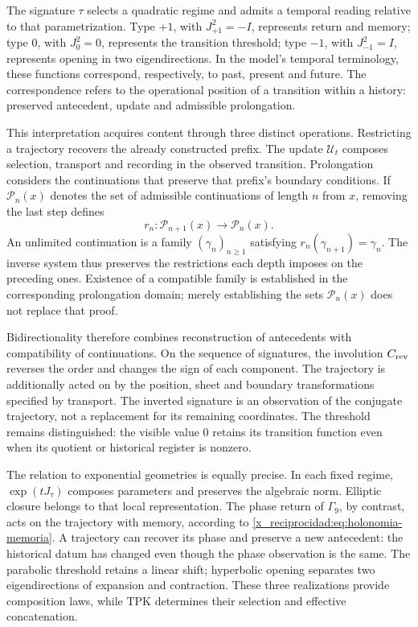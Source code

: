The signature \(\tau\) selects a quadratic regime and admits a temporal
reading relative to that parametrization. Type \(+1\), with
\(J_{+1}^{2}=-I\), represents return and memory; type \(0\), with
\(J_0^{2}=0\), represents the transition threshold; type \(-1\), with
\(J_{-1}^{2}=I\), represents opening in two eigendirections. In the
model's temporal terminology, these functions correspond,
respectively, to past, present and future. The correspondence refers
to the operational position of a transition within a history:
preserved antecedent, update and admissible prolongation.

This interpretation acquires content through three distinct operations.
Restricting a trajectory recovers the already constructed prefix. The
update \(\mathcal U_t\) composes selection, transport and recording in
the observed transition. Prolongation considers the continuations that
preserve that prefix's boundary conditions. If
\(\mathcal P_n(x)\) denotes the set of admissible continuations of
length \(n\) from \(x\), removing the last step defines
\[
 r_n:\mathcal P_{n+1}(x)\longrightarrow\mathcal P_n(x).
\]
An unlimited continuation is a family \((\gamma_n)_{n\geq1}\)
satisfying \(r_n(\gamma_{n+1})=\gamma_n\). The inverse system thus preserves
the restrictions each depth imposes on the
preceding ones. Existence of a compatible family is established in the
corresponding prolongation domain; merely establishing the
sets \(\mathcal P_n(x)\) does not replace that proof.

Bidirectionality therefore combines reconstruction of antecedents
with compatibility of continuations. On the sequence of signatures, the
involution \(C_{\rm rev}\) reverses the order and changes the sign of each
component. The trajectory is additionally acted on by the position,
sheet and boundary transformations specified by transport. The inverted
signature is an observation of the conjugate trajectory, not a replacement
for its remaining coordinates. The threshold remains distinguished: the visible
value \(0\) retains its transition function even when its quotient
or historical register is nonzero.

The relation to exponential geometries is equally precise. In
each fixed regime, \(\exp(tJ_\tau)\) composes parameters and preserves the
algebraic norm. Elliptic closure belongs to that local representation.
The phase return of \(\Gamma_9\), by contrast, acts on the trajectory
with memory, according to \eqref{x_reciprocidad:eq:holonomia-memoria}. A trajectory can
recover its phase and preserve a new antecedent: the historical datum has
changed even though the phase observation is the same. The parabolic threshold
retains a linear shift; hyperbolic opening separates two
eigendirections of expansion and contraction. These three realizations
provide composition laws, while TPK determines their
selection and effective concatenation.

